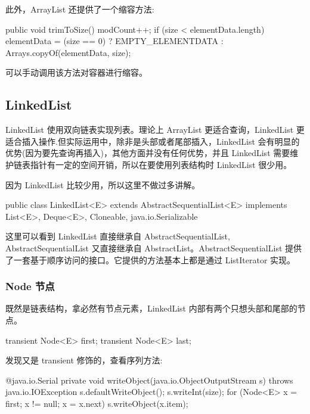 此外，ArrayList 还提供了一个缩容方法:

\begin{Java}
public void trimToSize() {
    modCount++;
    if (size < elementData.length) {
        elementData = (size == 0)
          ? EMPTY_ELEMENTDATA
          : Arrays.copyOf(elementData, size);
    }
}
\end{Java}

可以手动调用该方法对容器进行缩容。

\subsection{LinkedList}

LinkedList 使用双向链表实现列表。理论上 ArrayList 更适合查询，LinkedList 更适合插入操作.但实际运用中，除非是头部或者尾部插入，LinkedList 会有明显的优势(因为要先查询再插入)，其他方面并没有任何优势，并且 LinkedList 需要维护链表指针有一定的空间开销，所以在要使用列表结构时 LinkedList 很少用。

因为 LinkedList 比较少用，所以这里不做过多讲解。

\begin{Java}
public class LinkedList<E> extends AbstractSequentialList<E> implements List<E>, Deque<E>, Cloneable, java.io.Serializable
\end{Java}

这里可以看到 LinkedList 直接继承自 AbstractSequentialList, AbstractSequentialList 又直接继承自 AbstractList。AbstractSequentialList 提供了一套基于顺序访问的接口。它提供的方法基本上都是通过 ListIterator 实现。

\subsubsection{Node 节点}

既然是链表结构，拿必然有节点元素，LinkedList 内部有两个只想头部和尾部的节点。

\begin{Java}
transient Node<E> first;
transient Node<E> last;
\end{Java}

发现又是 transient 修饰的，查看序列方法:

\begin{Java}
@java.io.Serial
private void writeObject(java.io.ObjectOutputStream s)
    throws java.io.IOException {
    s.defaultWriteObject();
    s.writeInt(size);
    for (Node<E> x = first; x != null; x = x.next)
        s.writeObject(x.item);
}
\end{Java}

